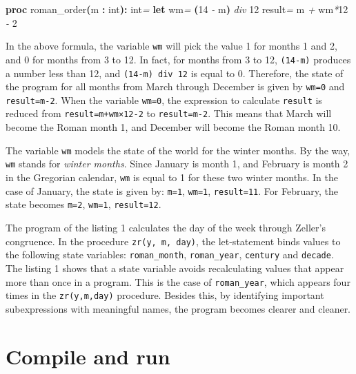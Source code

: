 \documentclass[
  12pt,
]{book}
\newenvironment{Shaded}{}{}
\newcommand{\CommentTok}[1]{\textcolor[rgb]{0.38,0.63,0.69}{\textit{#1}}}
\newcommand{\DataTypeTok}[1]{\textcolor[rgb]{0.56,0.13,0.00}{#1}}
\newcommand{\DecValTok}[1]{\textcolor[rgb]{0.25,0.63,0.44}{#1}}
\newcommand{\KeywordTok}[1]{\textcolor[rgb]{0.00,0.44,0.13}{\textbf{#1}}}
\newcommand{\NormalTok}[1]{#1}
\newcommand{\OtherTok}[1]{\textcolor[rgb]{0.00,0.44,0.13}{#1}}
\newcommand{\StringTok}[1]{\textcolor[rgb]{0.25,0.44,0.63}{#1}}
\begin{document}
\begin{Shaded}
\begin{Highlighting}[]

\KeywordTok{proc }\StringTok{roman\_order}\KeywordTok{(}\DataTypeTok{m} \KeywordTok{:} \DataTypeTok{int}\KeywordTok{):} \DataTypeTok{int}\CommentTok{=}
  \KeywordTok{let}\NormalTok{ wm}\CommentTok{=} \KeywordTok{(}\DecValTok{14} \CommentTok{{-}}\NormalTok{ m}\KeywordTok{)} \CommentTok{div} \DecValTok{12}
  \OtherTok{result}\CommentTok{=}\NormalTok{ m }\CommentTok{+}\NormalTok{ wm}\CommentTok{*}\DecValTok{12} \CommentTok{{-}} \DecValTok{2}
\end{Highlighting}
\end{Shaded}

In the above formula, the variable \texttt{wm} will pick the value 1 for
months 1 and 2, and 0 for months from 3 to 12. In fact, for months from
3 to 12, \texttt{(14-m)} produces a number less than 12, and
\texttt{(14-m)\ div\ 12} is equal to 0. Therefore, the state of the
program for all months from March through December is given by
\texttt{wm=0} and \texttt{result=m-2}. When the variable \texttt{wm=0},
the expression to calculate \texttt{result} is reduced from
\texttt{result=m+wm×12-2} to \texttt{result=m-2}. This means that March
will become the Roman month 1, and December will become the Roman month
10.

The variable \texttt{wm} models the state of the world for the winter
months. By the way, \texttt{wm} stands for \emph{winter months}. Since
January is month 1, and February is month 2 in the Gregorian calendar,
\texttt{wm} is equal to 1 for these two winter months. In the case of
January, the state is given by: \texttt{m=1}, \texttt{wm=1},
\texttt{result=11}. For February, the state becomes \texttt{m=2},
\texttt{wm=1}, \texttt{result=12}.

The program of the listing 1 calculates the day of the week through
Zeller's congruence. In the procedure \texttt{zr(y,\ m,\ day)}, the
let-statement binds values to the following state variables:
\texttt{roman\_month}, \texttt{roman\_year}, \texttt{century} and
\texttt{decade}. The listing 1 shows that a state variable avoids
recalculating values that appear more than once in a program. This is
the case of \texttt{roman\_year}, which appears four times in the
\texttt{zr(y,m,day)} procedure. Besides this, by identifying important
subexpressions with meaningful names, the program becomes clearer and
cleaner.

\section{Compile and run}\label{compile-and-run}
\end{document}
